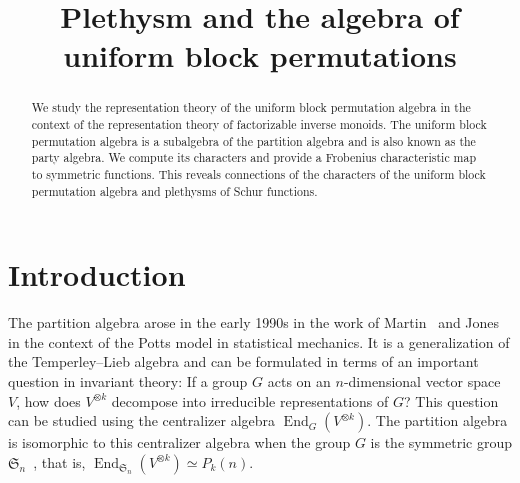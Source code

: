 \documentclass[ALCO,Unicode]{cedram}
\title[Plethysm and UBP]{Plethysm and the algebra of uniform block permutations}
\author[\initial{R.} Orellana]{\firstname{Rosa} \lastname{Orellana}}
\author[\initial{F.} Saliola]{\firstname{Franco} \lastname{Saliola}}
\author[\initial{A.} Schilling]{\firstname{Anne} \lastname{Schilling}}
\author[\initial{M.} Zabrocki]{\firstname{Mike} \lastname{Zabrocki}}
\begin{document}
\begin{abstract}
We study the representation theory of the uniform block permutation algebra in the context of the representation theory
of factorizable inverse monoids. The uniform block permutation algebra is a subalgebra of the partition algebra and is also
known as the party algebra. We compute its characters and provide a Frobenius characteristic map to symmetric functions.
This reveals connections of the characters of the uniform block permutation algebra and plethysms of Schur functions.
\end{abstract}

\maketitle



\section{Introduction}
\label{Introduction}

The partition algebra arose in the early 1990s in the work of Martin~\cite{Martin.1991,Martin.1994, Martin.1996, Martin.2000} and Jones~\cite{Jones.1994}
in the context of the Potts model in statistical mechanics. It is a generalization of the Temperley--Lieb algebra and can be formulated
in terms of an important question in invariant theory: If a group $G$ acts on an $n$-dimensional vector space $V$, how does $V^{\otimes k}$
decompose into irreducible representations of $G$? This question can be studied using the centralizer algebra $\operatorname{End}_G(V^{\otimes k})$.
The partition algebra is isomorphic to this centralizer algebra when the group $G$ is the symmetric group $\mathfrak{S}_n$~\cite{Jones.1994,Martin.1994}, that is, $\operatorname{End}_{\mathfrak{S}_n}(V^{\otimes k}) \simeq P_k(n)$.
\end{document}
